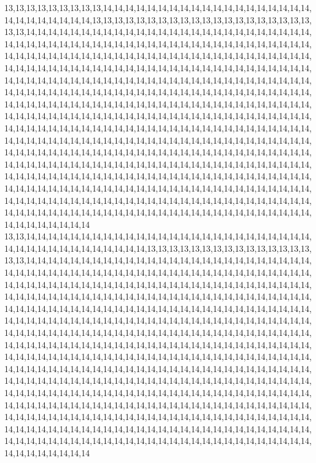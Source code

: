 13,13,13,13,13,13,13,13,13,14,14,14,14,14,14,14,14,14,14,14,14,14,14,14,14,14,14,14,14,14,14,14,14,14,14,14,13,13,13,13,13,13,13,13,13,13,13,13,13,13,13,13,13,13,13,13,13,13,14,14,14,14,14,14,14,14,14,14,14,14,14,14,14,14,14,14,14,14,14,14,14,14,14,14,14,14,14,14,14,14,14,14,14,14,14,14,14,14,14,14,14,14,14,14,14,14,14,14,14,14,14,14,14,14,14,14,14,14,14,14,14,14,14,14,14,14,14,14,14,14,14,14,14,14,14,14,14,14,14,14,14,14,14,14,14,14,14,14,14,14,14,14,14,14,14,14,14,14,14,14,14,14,14,14,14,14,14,14,14,14,14,14,14,14,14,14,14,14,14,14,14,14,14,14,14,14,14,14,14,14,14,14,14,14,14,14,14,14,14,14,14,14,14,14,14,14,14,14,14,14,14,14,14,14,14,14,14,14,14,14,14,14,14,14,14,14,14,14,14,14,14,14,14,14,14,14,14,14,14,14,14,14,14,14,14,14,14,14,14,14,14,14,14,14,14,14,14,14,14,14,14,14,14,14,14,14,14,14,14,14,14,14,14,14,14,14,14,14,14,14,14,14,14,14,14,14,14,14,14,14,14,14,14,14,14,14,14,14,14,14,14,14,14,14,14,14,14,14,14,14,14,14,14,14,14,14,14,14,14,14,14,14,14,14,14,14,14,14,14,14,14,14,14,14,14,14,14,14,14,14,14,14,14,14,14,14,14,14,14,14,14,14,14,14,14,14,14,14,14,14,14,14,14,14,14,14,14,14,14,14,14,14,14,14,14,14,14,14,14,14,14,14,14,14,14,14,14,14,14,14,14,14,14,14,14,14,14,14,14,14,14,14,14,14,14,14,14,14,14,14,14,14,14,14,14,14,14,14,14,14,14,14,14,14,14,14,14,14,14,14,14,14,14,14,14,14,14,14,14,14,14,14,14,14,14,14,14,14,14,14,14,14,14,14,14,14,14,14,14,14,14,14,14,14,14,14,14,14,14,14,14,14,14,14,14,14,14,14,14,14,14,14,14,14,14,14,14,14,14,14,14,14,14,14,14,14,14,14,14,14,14,14,14,14,14,14,14,14,14,14,14,14
13,13,14,14,14,14,14,14,14,14,14,14,14,14,14,14,14,14,14,14,14,14,14,14,14,14,14,14,14,14,14,14,14,14,14,14,14,14,14,14,14,13,13,13,13,13,13,13,13,13,13,13,13,13,13,13,13,13,14,14,14,14,14,14,14,14,14,14,14,14,14,14,14,14,14,14,14,14,14,14,14,14,14,14,14,14,14,14,14,14,14,14,14,14,14,14,14,14,14,14,14,14,14,14,14,14,14,14,14,14,14,14,14,14,14,14,14,14,14,14,14,14,14,14,14,14,14,14,14,14,14,14,14,14,14,14,14,14,14,14,14,14,14,14,14,14,14,14,14,14,14,14,14,14,14,14,14,14,14,14,14,14,14,14,14,14,14,14,14,14,14,14,14,14,14,14,14,14,14,14,14,14,14,14,14,14,14,14,14,14,14,14,14,14,14,14,14,14,14,14,14,14,14,14,14,14,14,14,14,14,14,14,14,14,14,14,14,14,14,14,14,14,14,14,14,14,14,14,14,14,14,14,14,14,14,14,14,14,14,14,14,14,14,14,14,14,14,14,14,14,14,14,14,14,14,14,14,14,14,14,14,14,14,14,14,14,14,14,14,14,14,14,14,14,14,14,14,14,14,14,14,14,14,14,14,14,14,14,14,14,14,14,14,14,14,14,14,14,14,14,14,14,14,14,14,14,14,14,14,14,14,14,14,14,14,14,14,14,14,14,14,14,14,14,14,14,14,14,14,14,14,14,14,14,14,14,14,14,14,14,14,14,14,14,14,14,14,14,14,14,14,14,14,14,14,14,14,14,14,14,14,14,14,14,14,14,14,14,14,14,14,14,14,14,14,14,14,14,14,14,14,14,14,14,14,14,14,14,14,14,14,14,14,14,14,14,14,14,14,14,14,14,14,14,14,14,14,14,14,14,14,14,14,14,14,14,14,14,14,14,14,14,14,14,14,14,14,14,14,14,14,14,14,14,14,14,14,14,14,14,14,14,14,14,14,14,14,14,14,14,14,14,14,14,14,14,14,14,14,14,14,14,14,14,14,14,14,14,14,14,14,14,14,14,14,14,14,14,14,14,14,14,14,14,14,14,14,14,14,14,14,14,14,14,14,14,14,14,14,14,14,14,14,14,14,14,14,14,14,14,14,14
